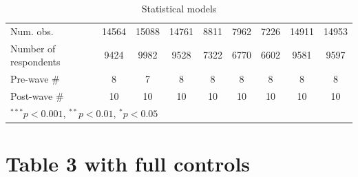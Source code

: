 \documentclass[12pt, letter]{article}
\begin{document}
\begin{table}
\begin{center}
{\begin{tabular}{l c c c c c c c c }
\hline
Num. obs.                        & 14564          & 15088          & 14761          & 8811           & 7962           & 7226           & 14911          & 14953          \\
Number of respondents & 9424 & 9982 & 9528 & 7322 & 6770 & 6602 & 9581 & 9597 \\ 
Pre-wave \# & 8 & 7 & 8 & 8 & 8 & 8 & 8 & 8 \\ 
Post-wave \# & 10 & 10 & 10 & 10 & 10 & 10 & 10 & 10 \\ 
\toprule[1.5pt]
\multicolumn{9}{l}{\scriptsize{$^{***}p<0.001$, $^{**}p<0.01$, $^*p<0.05$}}
\end{tabular}}
\caption{Statistical models}
\end{center}
\end{table}

\section{Table 3 with full controls} \label{appendixtable3}
\end{document}

